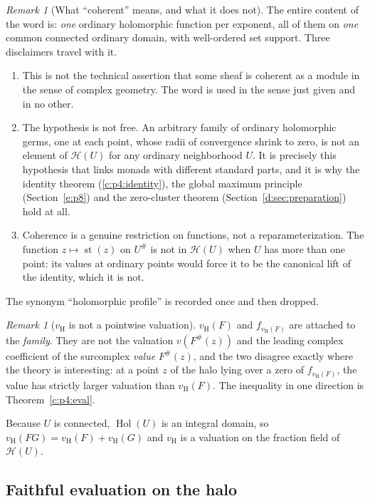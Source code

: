 \documentclass[11pt,a4paper]{article}
\numberwithin{equation}{section}
\theoremstyle{definition}
\theoremstyle{remark}
\newtheorem{remark}[theorem]{Remark}
\theoremstyle{plain}
\DeclareMathOperator{\Hol}{Hol}
\DeclareMathOperator{\st}{st}
\newcommand{\halo}[1]{#1^{\#}}
\newcommand{\Hc}{\mathcal H}
\newcommand{\vH}{v_{\mathrm H}}
\begin{document}
\begin{remark}[What ``coherent'' means, and what it does not]
\label{c:p4:rk-coherent}
The entire content of the word is: \emph{one} ordinary holomorphic
function per exponent, all of them on \emph{one} common connected
ordinary domain, with well-ordered set support. Three disclaimers
travel with it.
\begin{enumerate}[label=(\roman*)]
\item This is not the technical assertion that some sheaf is coherent as
a module in the sense of complex geometry. The word is used in the
sense just given and in no other.
\item The hypothesis is not free. An arbitrary family of ordinary
holomorphic germs, one at each point, whose radii of convergence shrink
to zero, is not an element of $\Hc(U)$ for any ordinary neighborhood
$U$. It is precisely this hypothesis that links monads with different
standard parts, and it is why the identity theorem
(\ref{c:p4:identity}), the global maximum principle
(Section~\ref{e:p8}) and the zero-cluster theorem (Section~\ref{d:sec:preparation}) hold at
all.
\item Coherence is a genuine restriction on functions, not a
reparameterization. The function $z\mapsto\st(z)$ on $\halo U$ is not
in $\Hc(U)$ when $U$ has more than one point: its values at ordinary
points would force it to be the canonical lift of the identity, which it
is not.
\end{enumerate}
The synonym ``holomorphic profile'' is recorded once and then dropped.
\end{remark}

\begin{remark}[$\vH$ is not a pointwise valuation]\label{c:p4:rk-vH}
$\vH(F)$ and $f_{\vH(F)}$ are attached to the \emph{family}. They are
not the valuation $v(F^{\#}(z))$ and the leading complex coefficient of
the surcomplex \emph{value} $F^{\#}(z)$, and the two disagree exactly
where the theory is interesting: at a point $z$ of the halo lying over a
zero of $f_{\vH(F)}$, the value has strictly larger valuation than
$\vH(F)$. The inequality in one direction is Theorem~\ref{c:p4:eval}.
\end{remark}

Because $U$ is connected, $\Hol(U)$ is an integral domain, so
$\vH(FG)=\vH(F)+\vH(G)$ and $\vH$ is a valuation on the fraction field
of $\Hc(U)$.

\subsection{Faithful evaluation on the halo}
\label{c:p4:evalsec}
\end{document}
